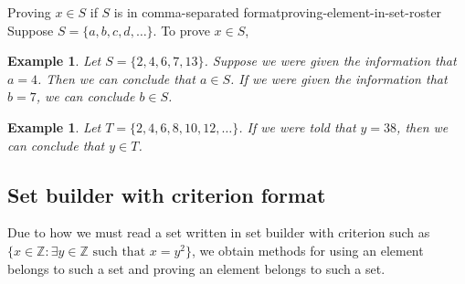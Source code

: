\documentclass{book}
\newcounter{ekcounter}%
\theoremstyle{ekimcustom}
\newtheorem{example}[ekcounter]{Example}
\begin{document}
\begin{bmethod}{Proving $x \in S$ if $S$ is in comma-separated format}{proving-element-in-set-roster}
Suppose $S = \{a,b,c,d,\dots\}$. To prove $x \in S$,
\begin{center}
\hskip0.1in
\hskip0.1in
\hskip0.1in
\hskip0.1in
\end{center}
\end{bmethod}
\begin{example}
Let $S = \{2, 4, 6, 7, 13\}$. Suppose we were given the information that $a = 4$. Then we can conclude that $a \in S$. 
If we were given the information that $b = 7$, we can conclude $b \in S$.
\end{example}
\begin{example}
Let $T = \{2, 4, 6, 8, 10, 12, \dots\}$. If we were told that $y = 38$, then we can conclude that $y \in T$.
\end{example}

\subsection{Set builder with criterion format}

Due to how we must read a set written in set builder with criterion such as $\{x \in \mathbb{Z} : \exists y \in \mathbb{Z} \text{ such that } x = y^2\}$, we obtain methods for using an element belongs to such a set and proving an element belongs to such a set.
\end{document}
